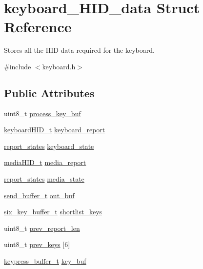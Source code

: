 \hypertarget{structkeyboard__HID__data}{}\section{keyboard\+\_\+\+H\+I\+D\+\_\+data Struct Reference}
\label{structkeyboard__HID__data}


Stores all the H\+ID data required for the keyboard.  




{\ttfamily \#include $<$keyboard.\+h$>$}

\subsection*{Public Attributes}
\begin{DoxyCompactItemize}
\item 
uint8\+\_\+t \hyperlink{structkeyboard__HID__data_ac6ff0934ffaa8af4a7357fa9c262f610}{process\+\_\+key\+\_\+buf}
\item 
\hyperlink{keyboard_8h_ae1e2d2809df85854a9c34195cd7be87b}{keyboard\+H\+I\+D\+\_\+t} \hyperlink{structkeyboard__HID__data_a00c66ed8ebc503cf1266ff8261f64d0c}{keyboard\+\_\+report}
\item 
\hyperlink{states_8h_a97ae098857b45ee4ac9f7ae3a41a7aff}{report\+\_\+states} \hyperlink{structkeyboard__HID__data_a5cc61600ba30d39b829d21187d97c74c}{keyboard\+\_\+state}
\item 
\hyperlink{keyboard_8h_a863aa6aa64424c7553e59386523412fe}{media\+H\+I\+D\+\_\+t} \hyperlink{structkeyboard__HID__data_aeaf1a6f8022be4e979a747412abc5d20}{media\+\_\+report}
\item 
\hyperlink{states_8h_a97ae098857b45ee4ac9f7ae3a41a7aff}{report\+\_\+states} \hyperlink{structkeyboard__HID__data_a93abdb2e65e86baa42983d4e25dfcfe3}{media\+\_\+state}
\item 
\hyperlink{keyboard_8h_ac075e64fc5b9925d7511d8afb5bdb2d2}{send\+\_\+buffer\+\_\+t} \hyperlink{structkeyboard__HID__data_a06a382dbb1ae17ec5fbb37d159ba2d53}{out\+\_\+buf}
\item 
\hyperlink{keyboard_8h_ade7751d5843483b986b63a84a5ea6963}{six\+\_\+key\+\_\+buffer\+\_\+t} \hyperlink{structkeyboard__HID__data_ad16a61decda61e908979f614f4052a1b}{shortlist\+\_\+keys}
\item 
uint8\+\_\+t \hyperlink{structkeyboard__HID__data_aa9ecfbfca2446bbfbeffbb0ac5d9f157}{prev\+\_\+report\+\_\+len}
\item 
uint8\+\_\+t \hyperlink{structkeyboard__HID__data_a3b701758e410ae765778b87007821d42}{prev\+\_\+keys} \mbox{[}6\mbox{]}
\item 
\hyperlink{keyboard_8h_ab586bec625b4d7aa91ae837cd567b247}{keypress\+\_\+buffer\+\_\+t} \hyperlink{structkeyboard__HID__data_a7f833c96a3af819be19cd72b5a92e39a}{key\+\_\+buf}
\end{DoxyCompactItemize}


